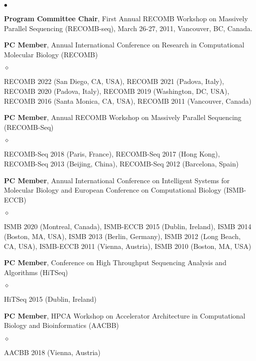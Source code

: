 \documentclass[margin,line]{res}
\newenvironment{list2}{
  \begin{list}{$\bullet$}{%
      \setlength{\itemsep}{0.1cm}
      \setlength{\parsep}{0in} \setlength{\parskip}{0in}
      \setlength{\topsep}{0in} \setlength{\partopsep}{0in} 
      \setlength{\leftmargin}{0.2in}}}{\end{list}}
\newenvironment{list3}{
  \begin{list}{$\diamond$}{%
      \setlength{\itemsep}{0in}
      \setlength{\parsep}{0.1cm} \setlength{\parskip}{0.1cm}
      \setlength{\topsep}{0.1cm} \setlength{\partopsep}{0.1cm} 
      \setlength{\leftmargin}{0.2in}}}{\end{list}}
\begin{document}
\begin{resume}
\begin{list2}
\item
  \textbf{Program Committee Chair}, First Annual RECOMB Workshop on Massively Parallel Sequencing (RECOMB-seq), March 26-27, 2011, Vancouver, BC, Canada.
  
  \item
  \textbf{PC Member}, Annual International Conference on Research in Computational Molecular Biology (RECOMB)
  \begin{list3}
    \item RECOMB 2022 (San Diego, CA, USA),
    RECOMB 2021 (Padova, Italy), RECOMB 2020 (Padova, Italy), RECOMB 2019 (Washington, DC, USA),  RECOMB 2016 (Santa Monica, CA, USA), RECOMB 2011 (Vancouver, Canada)
  \end{list3}
  
\item 
\textbf{PC Member},  Annual RECOMB Workshop on Massively Parallel Sequencing (RECOMB-Seq)
\begin{list3}
    \item RECOMB-Seq 2018 (Paris, France), RECOMB-Seq 2017 (Hong Kong), RECOMB-Seq 2013 (Beijing, China), RECOMB-Seq 2012 (Barcelona, Spain)
\end{list3}


\item
  \textbf{PC Member}, Annual International Conference on Intelligent Systems for Molecular Biology and  European Conference on 
  Computational Biology  (ISMB-ECCB)
  \begin{list3}
  \item ISMB 2020 (Montreal, Canada), ISMB-ECCB 2015 (Dublin, Ireland), ISMB 2014 (Boston, MA, USA), ISMB 2013 (Berlin, Germany), ISMB 2012 (Long Beach, CA, USA), ISMB-ECCB 2011 (Vienna, Austria), ISMB 2010 (Boston, MA, USA)
  \end{list3}

\item
  \textbf{PC Member}, Conference on High Throughput Sequencing Analysis and Algorithms (HiTSeq)
  \begin{list3}
      \item HiTSeq 2015 (Dublin, Ireland)
  \end{list3}

\item
  \textbf{PC Member}, 
HPCA Workshop on Accelerator Architecture in Computational Biology and Bioinformatics (AACBB)
\begin{list3}
    \item AACBB 2018 (Vienna, Austria)
\end{list3}


\end{list2}
\end{resume}
\end{document}
